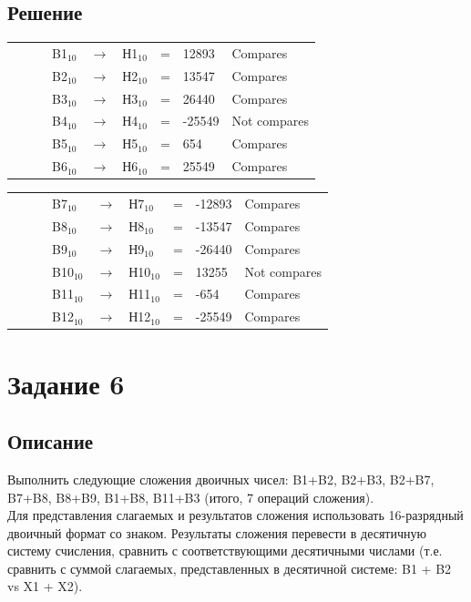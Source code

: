 \documentclass[11pt]{article}
\begin{document}
\subsection{Решение}
\label{sec:org78d9d18}
\setlength{\tabcolsep}{3pt}
\label{tab:org5009e7a}
\begin{tabular}{llllclcll}
 &  &  & B1\(_{\text{10}}\) & \(\to\) & Н1\(_{\text{10}}\) & = & 12893 & Compares\\
 &  &  & B2\(_{\text{10}}\) & \(\to\) & Н2\(_{\text{10}}\) & = & 13547 & Compares\\
 &  &  & B3\(_{\text{10}}\) & \(\to\) & Н3\(_{\text{10}}\) & = & 26440 & Compares\\
 &  &  & B4\(_{\text{10}}\) & \(\to\) & Н4\(_{\text{10}}\) & = & -25549 & Not compares\\
 &  &  & B5\(_{\text{10}}\) & \(\to\) & Н5\(_{\text{10}}\) & = & 654 & Compares\\
 &  &  & B6\(_{\text{10}}\) & \(\to\) & Н6\(_{\text{10}}\) & = & 25549 & Compares\\
\end{tabular}
\setlength{\tabcolsep}{3pt}
\label{tab:orgaa52d04}
\begin{tabular}{llllclcll}
 &  &  & B7\(_{\text{10}}\) & \(\to\) & Н7\(_{\text{10}}\) & = & -12893 & Compares\\
 &  &  & B8\(_{\text{10}}\) & \(\to\) & Н8\(_{\text{10}}\) & = & -13547 & Compares\\
 &  &  & B9\(_{\text{10}}\) & \(\to\) & Н9\(_{\text{10}}\) & = & -26440 & Compares\\
 &  &  & B10\(_{\text{10}}\) & \(\to\) & Н10\(_{\text{10}}\) & = & 13255 & Not compares\\
 &  &  & B11\(_{\text{10}}\) & \(\to\) & Н11\(_{\text{10}}\) & = & -654 & Compares\\
 &  &  & B12\(_{\text{10}}\) & \(\to\) & Н12\(_{\text{10}}\) & = & -25549 & Compares\\
\end{tabular}

\section{Задание 6}
\label{sec:orgdce295f}
\subsection{Описание}
\label{sec:org472f3a5}
Выполнить следующие сложения двоичных чисел: B1+B2, B2+B3, B2+B7, B7+B8, B8+B9, B1+B8, B11+B3 (итого, 7 операций сложения).\\
Для представления слагаемых и результатов сложения использовать 16-разрядный двоичный формат со знаком. Результаты сложения перевести в десятичную систему счисления, сравнить с соответствующими десятичными числами (т.е. сравнить с суммой слагаемых, представленных в десятичной системе: B1 + B2 vs X1 + X2).
\end{document}

